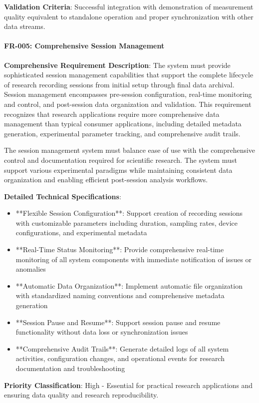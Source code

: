 \documentclass[12pt,a4paper]{article}
\begin{document}
\textbf{Validation Criteria}: Successful integration with demonstration of measurement quality equivalent to standalone
operation and proper synchronization with other data streams.

\paragraph{FR-005: Comprehensive Session Management}

\textbf{Comprehensive Requirement Description}: The system must provide sophisticated session management capabilities that
support the complete lifecycle of research recording sessions from initial setup through final data archival. Session
management encompasses pre-session configuration, real-time monitoring and control, and post-session data organization
and validation. This requirement recognizes that research applications require more comprehensive data management than
typical consumer applications, including detailed metadata generation, experimental parameter tracking, and
comprehensive audit trails.

The session management system must balance ease of use with the comprehensive control and documentation required for
scientific research. The system must support various experimental paradigms while maintaining consistent data
organization and enabling efficient post-session analysis workflows.

\textbf{Detailed Technical Specifications}:

\begin{itemize}
\item **Flexible Session Configuration**: Support creation of recording sessions with customizable parameters including
  duration, sampling rates, device configurations, and experimental metadata
\item **Real-Time Status Monitoring**: Provide comprehensive real-time monitoring of all system components with immediate
  notification of issues or anomalies
\item **Automatic Data Organization**: Implement automatic file organization with standardized naming conventions and
  comprehensive metadata generation
\item **Session Pause and Resume**: Support session pause and resume functionality without data loss or synchronization
  issues
\item **Comprehensive Audit Trails**: Generate detailed logs of all system activities, configuration changes, and
  operational events for research documentation and troubleshooting

\end{itemize}
\textbf{Priority Classification}: High - Essential for practical research applications and ensuring data quality and research
reproducibility.
\end{document}
